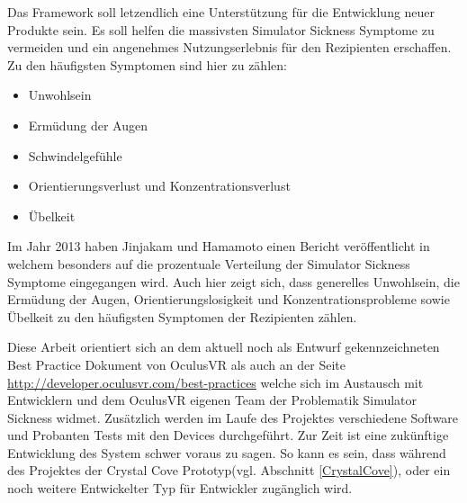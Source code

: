 \documentclass[pagesize, paper=a4, fontsize=12pt,titlepage=true, headings=small, headnosepline, abstractoff, liststotoc, nochapterprefix, plainheadsepline, twoside]{scrreprt}
\begin{document}
Das Framework soll letzendlich eine Unterstützung für die Entwicklung neuer Produkte sein. Es soll helfen die massivsten Simulator Sickness Symptome zu vermeiden und ein angenehmes Nutzungserlebnis für den Rezipienten erschaffen. Zu den häufigsten Symptomen sind hier zu zählen:
\begin{itemize}
\item Unwohlsein
\item Ermüdung der Augen
\item Schwindelgefühle
\item Orientierungsverlust und Konzentrationsverlust
\item Übelkeit
\end{itemize}

Im Jahr 2013 haben Jinjakam und Hamamoto einen Bericht veröffentlicht \cite{JinjakamHamamoto2012} in welchem besonders auf die prozentuale Verteilung der Simulator Sickness Symptome eingegangen wird. Auch hier zeigt sich, dass generelles Unwohlsein, die Ermüdung der Augen, Orientierungslosigkeit und Konzentrationsprobleme sowie Übelkeit zu den häufigsten Symptomen der Rezipienten zählen.

Diese Arbeit orientiert sich an dem aktuell noch als Entwurf gekennzeichneten Best Practice Dokument von OculusVR als auch an der Seite \url{http://developer.oculusvr.com/best-practices} welche sich im Austausch mit Entwicklern und dem OculusVR eigenen Team der Problematik Simulator Sickness widmet. Zusätzlich werden im Laufe des Projektes verschiedene Software und Probanten Tests mit den Devices durchgeführt. Zur Zeit ist eine zukünftige Entwicklung des System schwer voraus zu sagen. So kann es sein, dass während des Projektes der Crystal Cove Prototyp(vgl. Abschnitt \ref{CrystalCove}), oder ein noch weitere Entwickelter Typ für Entwickler zugänglich wird.
\end{document}
